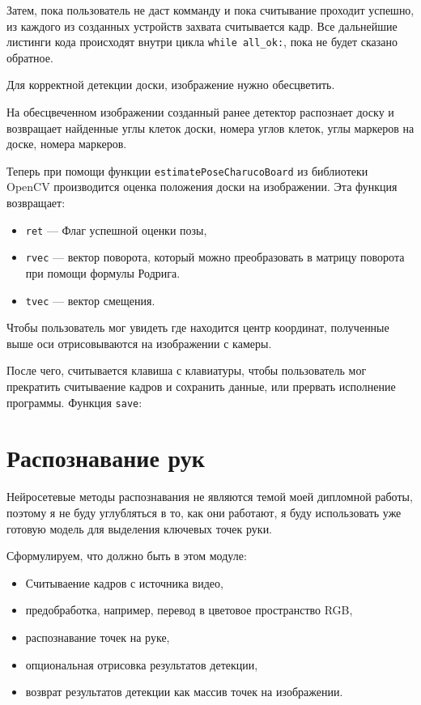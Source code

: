 \documentclass[12pt, a4paper]{article}
\begin{document}
Затем, пока пользователь не даст комманду и пока считывание проходит
успешно, из каждого из созданных устройств захвата считывается кадр. Все
дальнейшие листинги кода происходят внутри цикла \texttt{while all\_ok:}, пока не
будет сказано обратное.

Для корректной детекции доски, изображение нужно обесцветить.

На обесцвеченном изображении созданный ранее детектор распознает доску и
возвращает найденные углы клеток доски, номера углов клеток, углы маркеров
на доске, номера маркеров.

Теперь при помощи функции \texttt{estimatePoseCharucoBoard} из библиотеки
OpenCV производится оценка положения доски на изображении. Эта функция
возвращает:
\begin{itemize}
  \item \texttt{ret} --- Флаг успешной оценки позы,
  \item \texttt{rvec} --- вектор поворота, который можно преобразовать в
    матрицу поворота при помощи формулы Родрига.
  \item \texttt{tvec} --- вектор смещения.
\end{itemize}

Чтобы пользователь мог увидеть где находится центр координат, полученные
выше оси отрисовываются на изображении с камеры.

После чего, считывается клавиша с клавиатуры, чтобы пользователь мог
прекратить считываение кадров и сохранить данные, или прервать исполнение
программы.
Функция \texttt{save}:

\section{Распознавание рук}
Нейросетевые методы распознавания не являются темой моей дипломной работы,
поэтому я не буду углубляться в то, как они работают, я буду использовать уже готовую модель для выделения ключевых точек руки.

Сформулируем, что должно быть в этом модуле:
\begin{itemize}
  \item Считываение кадров с источника видео,
  \item предобработка, например, перевод в цветовое пространство RGB,
  \item распознавание точек на руке,
  \item опциональная отрисовка результатов детекции,
  \item возврат результатов детекции как массив точек на изображении.
\end{itemize}
\end{document}
